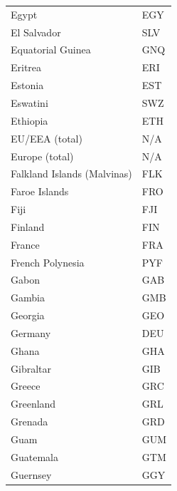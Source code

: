 \documentclass{report}
\begin{document}
\begin{center}
\begin{minipage}{0.46\textwidth}
\begin{tabular}{|p{10.5em}|p{6em}|}
            Egypt & EGY\\
            El Salvador & SLV\\
            Equatorial Guinea & GNQ\\
            Eritrea & ERI\\
            Estonia & EST\\
            Eswatini & SWZ\\
            Ethiopia & ETH\\
            EU/EEA (total) & N/A\\
            Europe (total) & N/A\\
            Falkland Islands (Malvinas) & FLK\\
            Faroe Islands & FRO\\
            Fiji & FJI\\
            Finland & FIN\\
            France & FRA\\
            French Polynesia & PYF\\
            Gabon & GAB\\
            Gambia & GMB\\
            Georgia & GEO\\
            Germany & DEU\\
            Ghana & GHA\\
            Gibraltar & GIB\\
            Greece & GRC\\
            Greenland & GRL\\
            Grenada & GRD\\
            Guam & GUM\\
            Guatemala & GTM\\
            Guernsey & GGY\\
            \hline
        \end{tabular}
    \end{minipage}


\end{center}
\end{document}
